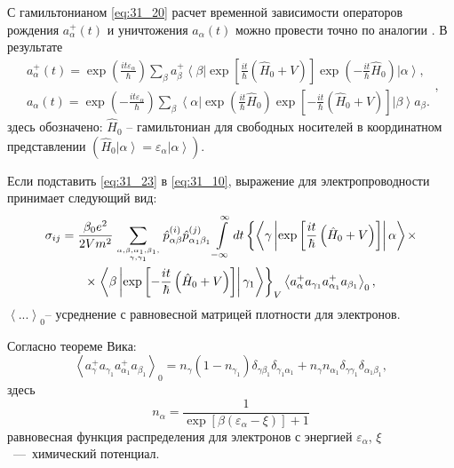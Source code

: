 С гамильтонианом \eqref{eq:31_20} расчет временной зависимости операторов
рождения $a_\alpha ^ + (t)$ и уничтожения $a_\alpha (t)$ можно
провести точно по аналогии \cite{Khamidullin2002}. В результате
\begin{equation}
\begin{array}{c}\label{eq:31_23}
\displaystyle a_\alpha ^ + (t) = \exp\left(
{\frac{it\varepsilon _\alpha }{\hbar }} \right)\sum\limits_\beta
{a_\beta ^ + \left\langle \beta \right|} \exp\left[
{\frac{it}{\hbar }\left( {\hat {H}_0 + V} \right)}
\right]\exp\left( { - \frac{it}{\hbar }\hat {H}_0 }
\right)\left| \alpha \right\rangle ,\\
\displaystyle a_\alpha (t) = \exp\left( { - \frac{it\varepsilon
		_\alpha }{\hbar }} \right)\sum\limits_\beta {\left\langle \alpha
	\right|} \exp\left( {\frac{it}{\hbar }\hat {H}_0 }
\right)\exp\left[ { - \frac{it}{\hbar }\left( {\hat {H}_0 + V}
	\right)} \right]\left| \beta \right\rangle a_\beta .
\end{array},
\end{equation}
здесь обозначено: $\hat {H}_0 $ -- гамильтониан для свободных
носителей в координатном представлении $\left( \hat {H}_0 \left| \alpha
\right\rangle = \varepsilon _\alpha \left| \alpha \right\rangle
\right) $.

Если подставить \eqref{eq:31_23}  в \eqref{eq:31_10}, выражение для
электропроводности принимает следующий вид:
\begin{multline}
\sigma_{ij}=\frac{\beta_0e^2}{2Vm^2}\sum\limits_{\alpha	,\beta ,\alpha _1 ,\beta _1, \atop \gamma ,\gamma _1 } 
\hat{p}_{\alpha \beta}^{(i)} \hat {p}_{\alpha _1 \beta_1}^{(j)}
\int\limits_{- \infty }^\infty
{dt \left\{ \left\langle \gamma \left|\exp\left[\frac{it}{\hbar}\left(\hat{H}_0 + V\right)\right]\right|\alpha\right\rangle\right.}\times\\
\times\displaystyle\left.\left\langle \beta
\left|\exp\left[-\frac{it}{\hbar}\left(\hat {H}_0 +
V\right)\right]\right|\gamma_1\right\rangle\right\}_V \left\langle
{a_\alpha ^ + a_{\gamma _1 } a_{\alpha _1 }^ + a_{\beta _1 } }
\right\rangle _0,
\end{multline}
$\left\langle
{...} \right\rangle _0 $-- усреднение с равновесной матрицей
плотности для электронов.

Согласно теореме Вика:
\begin{equation} \label{eq:31_26}
\left\langle {a_\gamma ^ + a_{\gamma _1 } a_{\alpha _1
	}^ + a_{\beta _1 } } \right\rangle _0 = n_\gamma \left( {1 -
	n_{\gamma _1 } } \right)\delta _{\gamma \beta _1 } \delta _{\gamma
	_1 \alpha _1 } + n_\gamma n_{\alpha _1 } \delta _{\gamma \gamma _1
} \delta _{\alpha _1 \beta _1 } ,
\end{equation}
здесь
\begin{equation}  \label{eq:31_26_20}
n_\alpha = \frac{1}{\exp\left[ \beta \left( {\varepsilon _\alpha - \xi } \right) \right] + 1}
\end{equation}
равновесная функция распределения для электронов с энергией $\varepsilon{_\alpha}$, $\xi $~---~химический потенциал.

